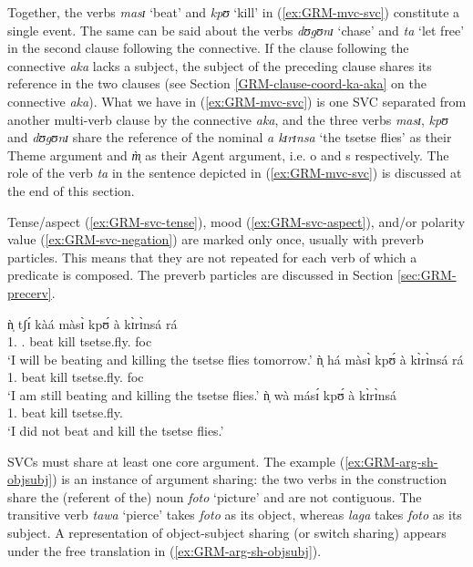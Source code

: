Together,  the verbs {\it masɪ} `beat' and  {\it kpʊ} `kill'  in 
(\ref{ex:GRM-mvc-svc})  constitute a single event.  The same can be said about 
the verbs {\it dʊgʊnɪ} `chase' and {\it ta} `let free' in the second clause
following the connective.   If the clause following the connective   {\it aka}
lacks a subject,  the subject of the preceding clause shares its reference in
the two clauses   (see Section \ref{GRM-clause-coord-ka-aka} on the connective 
{\it aka}). What we have in (\ref{ex:GRM-mvc-svc}) is one SVC separated from
another multi-verb clause by the connective {\it aka},  and the three verbs 
{\it 
masɪ},  {\it kpʊ} and {\it dʊgʊnɪ}  share the reference of the  nominal {\it a
kɪrɪnsa} `the tsetse flies' as their Theme argument and {\it m̩̀} as their Agent
argument, i.e. {\sc o} and {\sc s} respectively. The role of  the verb {\it ta}
in the sentence depicted in  (\ref{ex:GRM-mvc-svc}) is discussed at the end of
this section.

Tense/aspect (\ref{ex:GRM-svc-tense}), mood (\ref{ex:GRM-svc-aspect}), and/or
polarity value (\ref{ex:GRM-svc-negation}) are marked only once, usually with
preverb particles. This means that they are not repeated for each verb of which
a predicate is composed. The preverb particles are discussed in Section
\ref{sec:GRM-precerv}.


\ea\label{ex:GRM-svc-preverb}
 \ea\label{ex:GRM-svc-tense}{
\gll  ǹ̩ tʃɪ́ kàá màsɪ̀   kpʊ́   à     kɪ̀rɪ̀nsá rá\\
{1.\sg} {\cras} {\fut.\prog}   beat   kill    {\art} tsetse.fly.{\pl} {\sc foc} 
\\ 
\glt `I will be beating and killing the tsetse flies tomorrow.'
}
 \ex\label{ex:GRM-svc-aspect}{
\gll  ǹ̩  há màsɪ̀   kpʊ́   à     kɪ̀rɪ̀nsá rá\\
  {1.\sg}  {\mod}   beat   kill    {\art} tsetse.fly.{\pl} {\sc foc} \\ 
 \glt `I am still beating  and killing the tsetse flies.'
 }
 \ex\label{ex:GRM-svc-negation}{
\gll  ǹ̩   wà másɪ́   kpʊ́   à     kɪ̀rɪ̀nsá\\
  {1.\sg}  {\neg}   beat   kill    {\art} tsetse.fly.{\pl}\\
\glt `I did not beat and kill the tsetse flies.'
 }

\z 
 \z

SVCs must share at least one core  argument. The example 
(\ref{ex:GRM-arg-sh-objsubj}) is an instance of argument sharing: the two verbs
in the construction share the (referent of the) noun {\it foto} `picture' and
are not contiguous. The
transitive verb {\it tawa} `pierce' takes  {\it foto} as its object, whereas 
{\it laga} takes  {\it foto} as its subject. A representation of object-subject
sharing (or switch sharing) appears under the free translation in
(\ref{ex:GRM-arg-sh-objsubj}).

